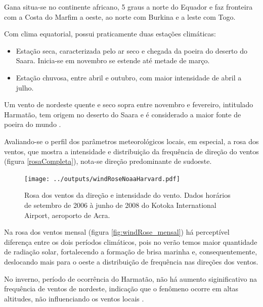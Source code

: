 
Gana situa-se no continente africano, 5 graus a norte do Equador e 
faz fronteira com a Costa do Marfim a oeste, ao norte com Burkina
e a leste com Togo. 

Com clima equatorial, possui praticamente duas estações climáticas:

\begin{itemize}
  \item Estação seca, caracterizada pelo ar seco e chegada da poeira do deserto 
        do Saara. Inicia-se em novembro se estende até metade de março.
  \item Estação chuvosa, entre abril e outubro, com maior intensidade de abril a
        julho.
\end{itemize}

Um vento de nordeste quente e seco sopra entre novembro e fevereiro,
intitulado Harmatão, tem origem no deserto do Saara e é considerado 
a maior fonte de poeira do mundo \citep{breuning2005}.


Avaliando-se o perfil dos parâmetros meteorológicos locais, em especial, 
a rosa dos ventos, que mostra a intensidade e distribuição da frequência de 
direção do ventos (figura \ref{rosaCompleta}),
nota-se direção predominante de sudoeste. 

\begin{figure}[H]
  \centering
  \texttt{[image: ../outputs/windRoseNoaaHarvard.pdf]}
  \caption{Rosa dos ventos da direção e intensidade do vento. 
           Dados horários de setembro de 2006 à junho de 2008 do 
           Kotoka International Airport, aeroporto de Acra. 
           \label{fg:rosaCompleta}}
\end{figure}

Na rosa dos ventos mensal (figura \ref{fig:windRose_mensal})
há perceptível diferença entre os dois períodos climáticos, 
pois no verão temos maior quantidade de radiação solar, fortalecendo a 
formação de brisa marinha e, consequentemente, deslocando mais para o 
oeste a distribuição de frequência nas direções dos ventos.

No inverno, período de ocorrência do Harmatão, não há aumento siginificativo 
na frequência de ventos de nordeste, indicação que o fenômeno ocorre em 
altas altitudes, não influenciando os ventos locais \citep{breuning2005}. 

